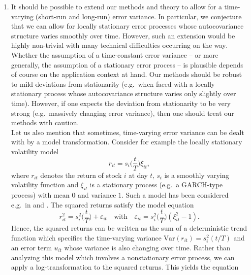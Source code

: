 \documentclass[a4paper,12pt]{article}
\begin{document}
\begin{enumerate}[label=\arabic*.,leftmargin=0.6cm]
\begin{enumerate}[label=(\roman*),leftmargin=0.75cm,topsep=0pt]
\item It should be possible to extend our methods and theory to allow for a time-varying (short-run and long-run) error variance. In particular, we conjecture that we can allow for locally stationary error processes whose autocovariance structure varies smoothly over time. 
However, such an extension would be highly non-trivial with many technical difficulties occurring on the way. \\
Whether the assumption of a time-constant error variance -- or more generally, the assumption of a stationary error process -- is plausible depends of course on the application context at hand. Our methods should be robust to mild deviations from stationarity (e.g.\ when faced with a locally stationary process whose autocovariance structure varies only slightly over time). However, if one expects the deviation from stationarity to be very strong (e.g.\ massively changing error variance), then one should treat our methods with caution. \\
Let us also mention that sometimes, time-varying error variance can be dealt with by a model transformation. Consider for example the locally stationary volatility model
\begin{equation}\label{eq:volatility-model} 
r_{it} = s_i\Big(\frac{t}{T}\Big) \xi_{it}, 
\end{equation}
where $r_{it}$ denotes the return of stock $i$ at day $t$, $s_i$ is a smoothly varying volatility function and $\xi_{it}$ is a stationary process (e.g.\ a GARCH-type process) with mean $0$ and variance $1$. Such a model has been considered e.g.\ in \cite{Feng2004} and \cite{HafnerLinton2010}. The squared returns satisfy the model equation
\[ r_{it}^2 = s_i^2\Big(\frac{t}{T}\Big) + \varepsilon_{it} \quad \text{with} \quad \varepsilon_{it} = s_i^2\Big(\frac{t}{T}\Big) (\xi_{it}^2 - 1). \]
Hence, the squared returns can be written as the sum of a deterministic trend function which specifies the time-varying variance $\text{Var}(r_{it}) = s_i^2(t/T)$ and an error term $u_{it}$ whose variance is also changing over time. Rather than analyzing this model which involves a nonstationary error process, we can apply a log-transformation to the squared returns. This yields the equation 

\end{enumerate}
\end{enumerate}
\end{document}

